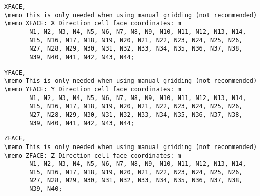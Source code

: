 \begin{lstlisting}
XFACE,
\memo This is only needed when using manual gridding (not recommended)
\memo XFACE: X Direction cell face coordinates: m
       N1, N2, N3, N4, N5, N6, N7, N8, N9, N10, N11, N12, N13, N14,
       N15, N16, N17, N18, N19, N20, N21, N22, N23, N24, N25, N26,
       N27, N28, N29, N30, N31, N32, N33, N34, N35, N36, N37, N38,
       N39, N40, N41, N42, N43, N44;
\end{lstlisting}

\begin{lstlisting}
YFACE,
\memo This is only needed when using manual gridding (not recommended)
\memo YFACE: Y Direction cell face coordinates: m
       N1, N2, N3, N4, N5, N6, N7, N8, N9, N10, N11, N12, N13, N14,
       N15, N16, N17, N18, N19, N20, N21, N22, N23, N24, N25, N26,
       N27, N28, N29, N30, N31, N32, N33, N34, N35, N36, N37, N38,
       N39, N40, N41, N42, N43, N44;
\end{lstlisting}

\begin{lstlisting}
ZFACE,
\memo This is only needed when using manual gridding (not recommended)
\memo ZFACE: Z Direction cell face coordinates: m
       N1, N2, N3, N4, N5, N6, N7, N8, N9, N10, N11, N12, N13, N14,
       N15, N16, N17, N18, N19, N20, N21, N22, N23, N24, N25, N26,
       N27, N28, N29, N30, N31, N32, N33, N34, N35, N36, N37, N38,
       N39, N40;
\end{lstlisting}

